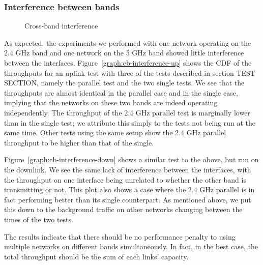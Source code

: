 
\subsubsection{Interference between bands}

\begin{figure}[h]
 \centering
 \subfloat[][Uplink] {\
   \scalebox{0.55}{}\label{graph:cb-interference-up}
 }
 \subfloat[][Downlink] {\
   \scalebox{0.55}{}\label{graph:cb-interference-down}
 }
 \caption{Cross-band interference}\label{graph:cb-interference}
\end{figure}


As expected, the experiments we performed with one network operating on the 2.4 GHz band and one network on the 5 GHz band showed little interference between the interfaces.
Figure~\ref{graph:cb-interference-up} shows the CDF of the throughputs for an
uplink test with three of the tests described in section TEST SECTION, namely   %
the parallel test and the two single tests. We see that the throughputs are
almost identical in the parallel case and in the single case, implying that the networks on these
two bands are indeed operating independently. The throughput of the 2.4 GHz parallel test is marginally lower than in the single test; we attribute this simply to the tests not being run at the same time. Other tests using the same setup show the
2.4 GHz parallel throughput to be higher than that of the single.


Figure~\ref{graph:cb-interference-down} shows a similar test to the above, but
run on the downlink. We see the same lack of interference between the interfaces, with the throughput on one interface being unrelated to whether the other band is transmitting or not. This plot also shows a case where the 2.4 GHz
parallel is in fact performing better than its single counterpart. As mentioned
above, we put this down to the background traffic on other networks changing
between the times of the two tests.

The results indicate that there should be no performance penalty to using multiple networks on different bands simultaneously. In fact, in the best case, the total throughput should be the sum of each links' capacity.

